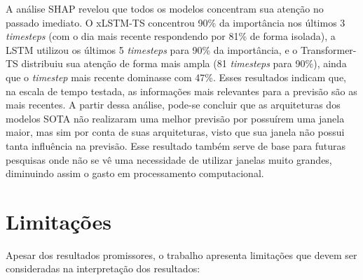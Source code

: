 A análise SHAP revelou que todos os modelos concentram sua atenção no passado imediato. O xLSTM-TS concentrou 90\% da importância nos últimos 3 \textit{timesteps} (com o dia mais recente respondendo por 81\% de forma isolada), a LSTM utilizou os últimos 5 \textit{timesteps} para 90\% da importância, e o Transformer-TS distribuiu sua atenção de forma mais ampla (81 \textit{timesteps} para 90\%), ainda que o \textit{timestep} mais recente dominasse com 47\%. Esses resultados indicam que, na escala de tempo testada, as informações mais relevantes para a previsão são as mais recentes. A partir dessa análise, pode-se concluir que as arquiteturas dos modelos SOTA não realizaram uma melhor previsão por possuírem uma janela maior, mas sim por conta de suas arquiteturas, visto que sua janela não possui tanta influência na previsão. Esse resultado também serve de base para futuras pesquisas onde não se vê uma necessidade de utilizar janelas muito grandes, diminuindo assim o gasto em processamento computacional.

\section{Limitações}

Apesar dos resultados promissores, o trabalho apresenta limitações que devem ser consideradas na interpretação dos resultados:

